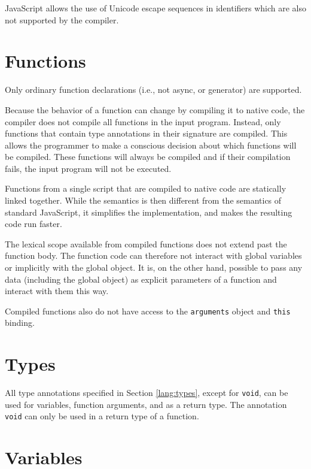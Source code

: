 JavaScript allows the use of Unicode escape sequences in identifiers which are also not supported by the compiler.



\section{Functions}

Only ordinary function declarations (i.e., not async, or generator) are supported.

Because the behavior of a function can change by compiling it to native code, the compiler does not compile all functions in the input program. Instead, only functions that contain type annotations in their signature are compiled. This allows the programmer to make a conscious decision about which functions will be compiled. These functions will always be compiled and if their compilation fails, the input program will not be executed.

Functions from a single script that are compiled to native code are statically linked together. While the semantics is then different from the semantics of standard JavaScript, it simplifies the implementation, and makes the resulting code run faster.

The lexical scope available from compiled functions does not extend past the function body. The function code can therefore not interact with global variables or implicitly with the global object. It is, on the other hand, possible to pass any data (including the global object) as explicit parameters of a function and interact with them this way.

Compiled functions also do not have access to the \texttt{arguments} object and \texttt{this} binding.


\section{Types}

All type annotations specified in Section \ref{lang:types}, except for \texttt{void}, can be used for variables, function arguments, and as a return type. The annotation \texttt{void} can only be used in a return type of a function.


\section{Variables}

